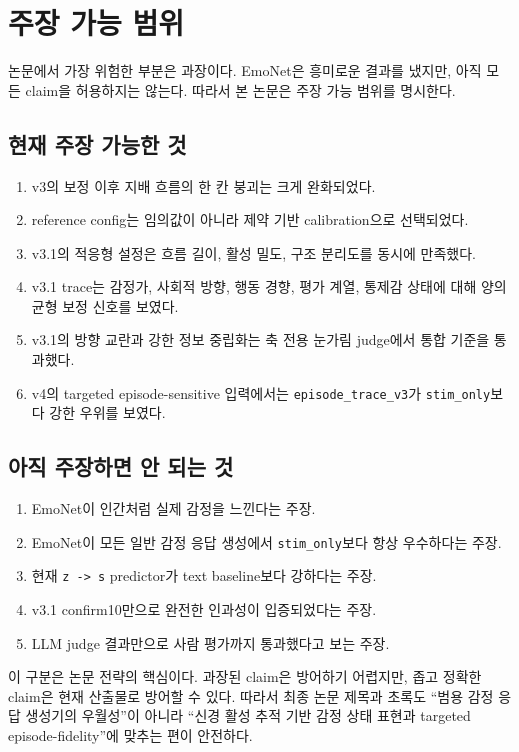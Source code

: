 \documentclass[11pt,a4paper]{article}
\newcommand{\eng}[1]{\texttt{#1}}
\begin{document}
\section{주장 가능 범위}

논문에서 가장 위험한 부분은 과장이다. EmoNet은 흥미로운 결과를 냈지만, 아직 모든 claim을 허용하지는 않는다. 따라서 본 논문은 주장 가능 범위를 명시한다.

\subsection{현재 주장 가능한 것}

\begin{enumerate}
  \item v3의 보정 이후 지배 흐름의 한 칸 붕괴는 크게 완화되었다.
  \item reference config는 임의값이 아니라 제약 기반 calibration으로 선택되었다.
  \item v3.1의 적응형 설정은 흐름 길이, 활성 밀도, 구조 분리도를 동시에 만족했다.
  \item v3.1 trace는 감정가, 사회적 방향, 행동 경향, 평가 계열, 통제감 상태에 대해 양의 균형 보정 신호를 보였다.
  \item v3.1의 방향 교란과 강한 정보 중립화는 축 전용 눈가림 judge에서 통합 기준을 통과했다.
  \item v4의 targeted episode-sensitive 입력에서는 \eng{episode\_trace\_v3}가 \eng{stim\_only}보다 강한 우위를 보였다.
\end{enumerate}

\subsection{아직 주장하면 안 되는 것}

\begin{enumerate}
  \item EmoNet이 인간처럼 실제 감정을 느낀다는 주장.
  \item EmoNet이 모든 일반 감정 응답 생성에서 \eng{stim\_only}보다 항상 우수하다는 주장.
  \item 현재 \eng{z -> s} predictor가 text baseline보다 강하다는 주장.
  \item v3.1 confirm10만으로 완전한 인과성이 입증되었다는 주장.
  \item LLM judge 결과만으로 사람 평가까지 통과했다고 보는 주장.
\end{enumerate}

이 구분은 논문 전략의 핵심이다. 과장된 claim은 방어하기 어렵지만, 좁고 정확한 claim은 현재 산출물로 방어할 수 있다. 따라서 최종 논문 제목과 초록도 ``범용 감정 응답 생성기의 우월성''이 아니라 ``신경 활성 추적 기반 감정 상태 표현과 targeted episode-fidelity''에 맞추는 편이 안전하다.
\end{document}
